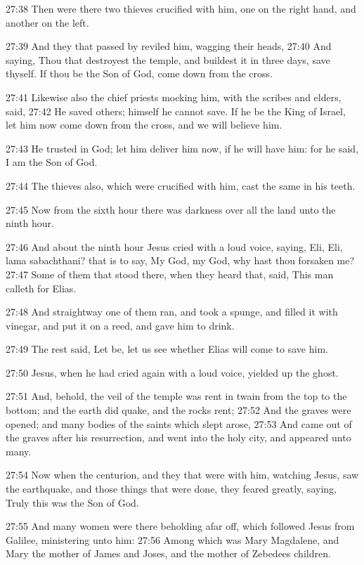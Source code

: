 27:38 Then were there two thieves crucified with him, one on the right
hand, and another on the left.

27:39 And they that passed by reviled him, wagging their heads, 27:40
And saying, Thou that destroyest the temple, and buildest it in three
days, save thyself. If thou be the Son of God, come down from the
cross.

27:41 Likewise also the chief priests mocking him, with the scribes
and elders, said, 27:42 He saved others; himself he cannot save. If he
be the King of Israel, let him now come down from the cross, and we
will believe him.

27:43 He trusted in God; let him deliver him now, if he will have him:
for he said, I am the Son of God.

27:44 The thieves also, which were crucified with him, cast the same
in his teeth.

27:45 Now from the sixth hour there was darkness over all the land
unto the ninth hour.

27:46 And about the ninth hour Jesus cried with a loud voice, saying,
Eli, Eli, lama sabachthani? that is to say, My God, my God, why hast
thou forsaken me?  27:47 Some of them that stood there, when they
heard that, said, This man calleth for Elias.

27:48 And straightway one of them ran, and took a spunge, and filled
it with vinegar, and put it on a reed, and gave him to drink.

27:49 The rest said, Let be, let us see whether Elias will come to
save him.

27:50 Jesus, when he had cried again with a loud voice, yielded up the
ghost.

27:51 And, behold, the veil of the temple was rent in twain from the
top to the bottom; and the earth did quake, and the rocks rent; 27:52
And the graves were opened; and many bodies of the saints which slept
arose, 27:53 And came out of the graves after his resurrection, and
went into the holy city, and appeared unto many.

27:54 Now when the centurion, and they that were with him, watching
Jesus, saw the earthquake, and those things that were done, they
feared greatly, saying, Truly this was the Son of God.

27:55 And many women were there beholding afar off, which followed
Jesus from Galilee, ministering unto him: 27:56 Among which was Mary
Magdalene, and Mary the mother of James and Joses, and the mother of
Zebedees children.


